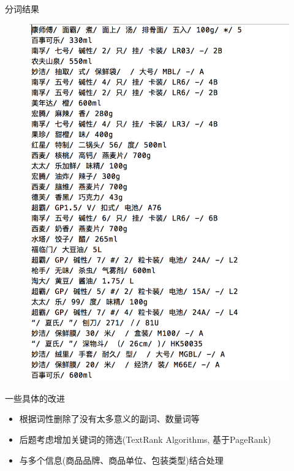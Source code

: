 \documentclass{beamer}
\begin{document}
  \begin{frame}{分词结果}
    \begin{figure}
      \centering
      \includegraphics[width=\textwidth]{Nov-9/result}
    \end{figure}
  \end{frame}
  \begin{frame}{一些具体的改进} 
    \begin{itemize}
      \item 根据词性删除了没有太多意义的副词、数量词等
      \item 后题考虑增加关键词的筛选(TextRank Algorithms, 基于PageRank)
      \item 与多个信息(商品品牌、商品单位、包装类型)结合处理
    \end{itemize}
  \end{frame} 
\end{document}
